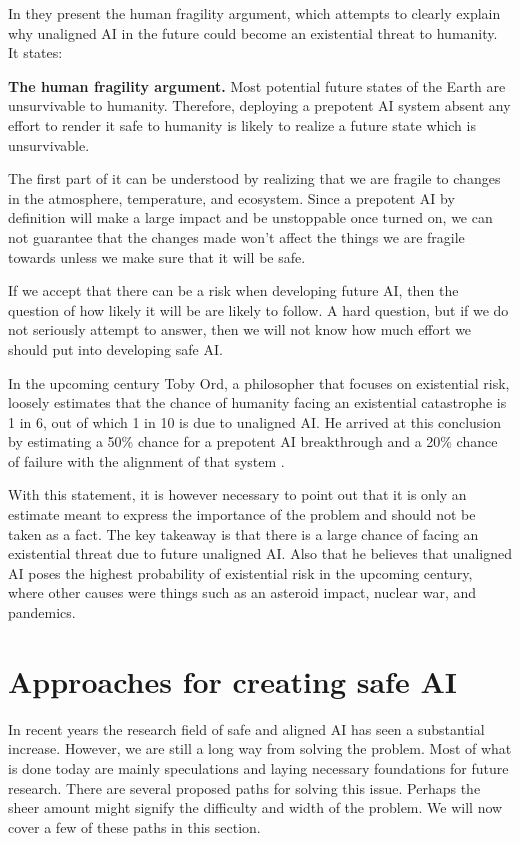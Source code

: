 \documentclass[12pt,A4]{report}
\theoremstyle{definition}
\begin{document}
In \autocite{Critch Kruger} they present the human fragility argument, which attempts to clearly explain why unaligned AI in the future could become an existential threat to humanity. It states:
\begin{displayquote}
\textbf{The human fragility argument.} 
Most potential future states of the Earth are unsurvivable to humanity. Therefore, deploying a prepotent AI system absent any effort to render it safe to humanity is likely to realize a future state which is unsurvivable. 
\end{displayquote}
The first part of it can be understood by realizing that we are fragile to changes in the atmosphere, temperature, and ecosystem. Since a prepotent AI by definition will make a large impact and be unstoppable once turned on, we can not guarantee that the changes made won't affect the things we are fragile towards unless we make sure that it will be safe. 

If we accept that there can be a risk when developing future AI, then the question of how likely it will be are likely to follow. A hard question, but if we do not seriously attempt to answer, then we will not know how much effort we should put into developing safe AI. 

In the upcoming century Toby Ord, a philosopher that focuses on existential risk, loosely estimates that the chance of humanity facing an existential catastrophe is 1 in 6, out of which 1 in 10 is due to unaligned AI\autocite{precipice}. He arrived at this conclusion by estimating a 50\% chance for a prepotent AI breakthrough and a 20\% chance of failure with the alignment of that system \autocite{rationally speaking}. 

With this statement, it is however necessary to point out that it is only an estimate meant to express the importance of the problem and should not be taken as a fact. The key takeaway is that there is a large chance of facing an existential threat due to future unaligned AI. Also that he believes that unaligned AI poses the highest probability of existential risk in the upcoming century, where other causes were things such as an asteroid impact, nuclear war, and pandemics. 


\section{Approaches for creating safe AI}
In recent years the research field of safe and aligned AI has seen a substantial increase. However, we are still a long way from solving the problem. Most of what is done today are mainly speculations and laying necessary foundations for future research. There are several proposed paths for solving this issue. Perhaps the sheer amount might signify the difficulty and width of the problem. We will now cover a few of these paths in this section.
\end{document}
